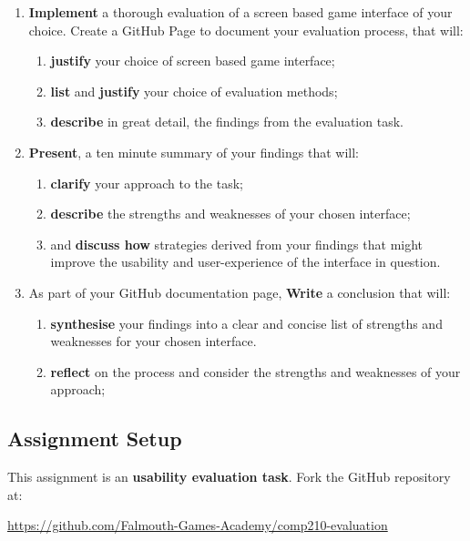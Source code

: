 \documentclass{../fal_assignment}
\begin{document}
\begin{enumerate}[label=(\alph*)]
    \item \textbf{Implement} a thorough evaluation of a screen based game interface of your choice. Create a GitHub Page to document your evaluation process, that will:
    	\begin{enumerate}[label=\roman*.]
    		\item \textbf{justify} your choice of screen based game interface;
    		\item \textbf{list} and \textbf{justify} your choice of evaluation methods;
		\item \textbf{describe} in great detail, the findings from the evaluation task.
	\end{enumerate}
    \item \textbf{Present}, a ten minute summary of your findings that will:
    	\begin{enumerate}[label=\roman*.]
    		\item \textbf{clarify} your approach to the task;
    		\item \textbf{describe} the strengths and weaknesses of your chosen interface;
    		\item and \textbf{discuss how} strategies derived from your findings that might improve the usability and user-experience of the interface in question.
	\end{enumerate}
	\item As part of your GitHub documentation page, \textbf{Write} a conclusion that will:
    	\begin{enumerate}[label=\roman*.]
    		\item \textbf{synthesise} your findings into a clear and concise list of strengths and weaknesses for your chosen interface. 
    		\item \textbf{reflect} on the process and consider the strengths and weaknesses of your approach;
	\end{enumerate}
\end{enumerate}

\subsection*{Assignment Setup}

This assignment is an \textbf{usability evaluation task}. Fork the GitHub repository at:

\indent \url{https://github.com/Falmouth-Games-Academy/comp210-evaluation}
\end{document}
